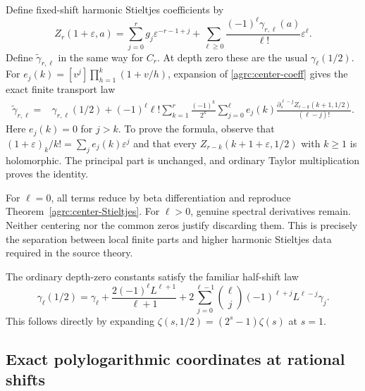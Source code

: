 Define fixed-shift harmonic Stieltjes coefficients by
\begin{equation}\label{agrc:harmonic-Stieltjes}
 Z_r(1+\varepsilon,a)=
 \sum_{j=0}^r g_j\varepsilon^{-r-1+j}
 +\sum_{\ell\geq0}\frac{(-1)^\ell\gamma_{r,\ell}(a)}{\ell!}
                                             \varepsilon^\ell.
\end{equation}
Define $\widetilde\gamma_{r,\ell}$ in the same way for $C_r$.
At depth zero these are the usual $\gamma_\ell(1/2)$.
For $e_j(k)=[v^j]\prod_{h=1}^k(1+v/h)$, expansion of
\eqref{agrc:center-coeff} gives the exact finite transport law
\begin{align}
 \widetilde\gamma_{r,\ell}
 ={}&\gamma_{r,\ell}(1/2)
 +(-1)^\ell\ell!\sum_{k=1}^r\frac{(-1)^k}{2^k}
       \sum_{j=0}^{\ell}e_j(k)
     \frac{\partial_s^{\ell-j}Z_{r-k}(k+1,1/2)}{(\ell-j)!}.
 \label{agrc:Stieltjes-transport}
\end{align}
Here $e_j(k)=0$ for $j>k$. To prove the formula, observe that
$(1+\varepsilon)_k/k!=\sum_j e_j(k)\varepsilon^j$ and that every
$Z_{r-k}(k+1+\varepsilon,1/2)$ with $k\geq1$ is holomorphic.
The principal part is unchanged, and ordinary Taylor multiplication
proves the identity.

For $\ell=0$, all terms reduce by beta differentiation and reproduce
Theorem~\ref{agrc:center-Stieltjes}. For $\ell>0$, genuine spectral
derivatives remain. Neither centering nor the common zeros justify
discarding them. This is precisely the separation between local finite
parts and higher harmonic Stieltjes data required in the source theory.

The ordinary depth-zero constants satisfy the familiar half-shift law
\begin{equation}\label{agrc:half-Stieltjes}
 \gamma_\ell(1/2)=\gamma_\ell
 +\frac{2(-1)^\ell L^{\ell+1}}{\ell+1}
 +2\sum_{j=0}^{\ell-1}\binom{\ell}{j}
                       (-1)^{\ell+j}L^{\ell-j}\gamma_j.
\end{equation}
This follows directly by expanding
$\zeta(s,1/2)=(2^s-1)\zeta(s)$ at $s=1$.

\subsection{Exact polylogarithmic coordinates at rational shifts}


